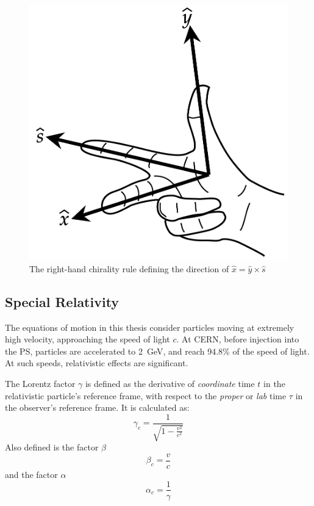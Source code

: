 \documentclass[a4paper,twoside,11pt]{report}
\begin{document}
\begin{figure}[!h]
  \centering
  \includegraphics[scale=.25]{rhr.pdf}
  \caption[The right-hand rule]{The right-hand chirality rule defining the direction of $\hat x = \hat y \times \hat s$}\label{fig:rhr}
\end{figure}

\subsection{Special Relativity}

The equations of motion in this thesis consider particles moving at extremely high velocity, approaching the speed of light $c$. At CERN, before injection into the PS, particles are accelerated to \qty{2}{\giga\electronvolt}, and reach 94.8\% of the speed of light. At such speeds, relativistic effects are significant.

The Lorentz factor $\gamma$ is defined as the derivative of \textit{coordinate} time $t$ in the relativistic particle's reference frame, with respect to the \textit{proper} or \textit{lab} time $\tau$ in the observer's reference frame. It is calculated as:
\begin{equation}
    \gamma_c = \frac 1{\sqrt{1-\frac{v^2}{c^2}}}
\end{equation}
Also defined is the factor $\beta$
\begin{equation}
    \beta_c = \frac vc
\end{equation}
and the factor $\alpha$
\begin{equation}
    \alpha_c = \frac 1\gamma
\end{equation}
\end{document}

